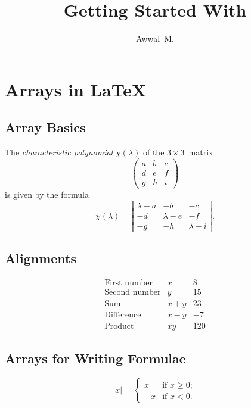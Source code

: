 \documentclass[a4paper,12pt]{article}
\begin{document}
\title{Getting Started With \LaTeXe{}}
\author{Awwal~M.}
\maketitle

\section{Arrays in \LaTeX{}}\label{sec:arrays-in-latex{}}

\subsection{Array Basics}\label{subsec:array-basics}
The \emph{characteristic polynomial} $\chi(\lambda)$ of the $3 \times 3$~matrix
\[ \left(
 \begin{array}{ccc}
    a & b & c \\
    d & e & f \\
    g & h & i
 \end{array}
\right)\]
is given by the formula
\[ \chi(\lambda) = \left|
   \begin{array}{ccc}
      \lambda - a & -b & -c \\
       -d & \lambda - e & -f \\
       -g & -h & \lambda - i
   \end{array}
\right| .\]

\subsection{Alignments}\label{subsec:alignments}
\[ \begin{array}{lcr} 
   \mbox{First number} & x & 8 \\ 
   \mbox{Second number} & y & 15 \\ 
   \mbox{Sum} & x + y & 23 \\ 
   \mbox{Difference} & x - y & -7 \\ 
   \mbox{Product} & xy & 120 
\end{array}\]

\subsection{Arrays for Writing Formulae}\label{subsec:arrays-for-writing-formulae}
\[ |x| = \left\{ 
    \begin{array}{ll}
        x & \mbox{if $x \geq 0$};\\
        -x & \mbox{if $x < 0$}.
    \end{array}
\right. \]
\end{document}
